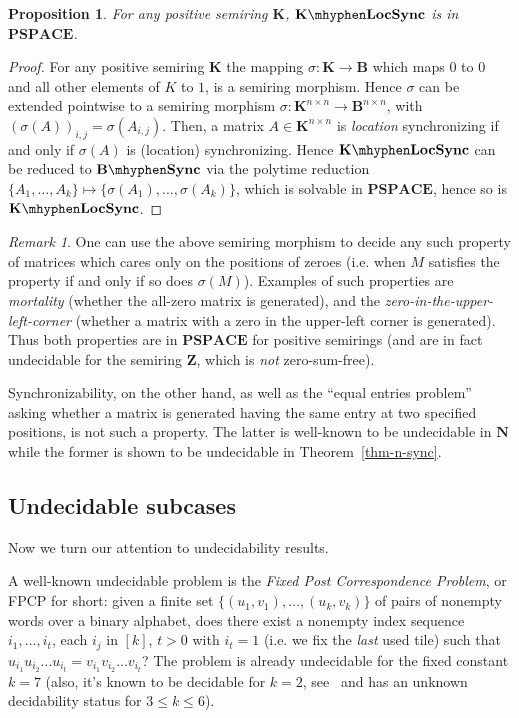 \documentclass[submission,copyright,creativecommons]{eptcs}
\def\bK{{\mathbf{K}}}
\def\bN{{\mathbf{N}}}
\def\bZ{{\mathbf{Z}}}
\def\bB{{\mathbf{B}}}
\theoremstyle{plain}
\newtheorem{proposition}{Proposition}
\theoremstyle{definition}
\theoremstyle{remark}
\newtheorem{remark}{Remark}
\begin{document}
\begin{proposition}
\label{prop-zsf-zdf}
For any positive semiring $\bK$, $\bK\mhyphen\mathbf{LocSync}$ is in $\mathbf{PSPACE}$.
\end{proposition}
\begin{proof}
For any positive semiring $\bK$ the mapping $\sigma:\bK\to\bB$ which maps $0$ to $0$ and all other elements of $K$ to $1$,
is a semiring morphism. Hence $\sigma$ can be extended pointwise to a semiring morphism $\sigma:\bK^{n\times n}\to\bB^{n\times n}$,
with $(\sigma(A))_{i,j}=\sigma(A_{i,j})$. Then, a matrix $A\in\bK^{n\times n}$ is \emph{location} synchronizing if and only if
$\sigma(A)$ is (location) synchronizing. Hence $\bK\mhyphen\mathbf{LocSync}$ can be reduced to $\bB\mhyphen\mathbf{Sync}$
via the polytime reduction $\{A_1,\ldots,A_k\}\mapsto\{\sigma(A_1),\ldots,\sigma(A_k)\}$, which is solvable in $\mathbf{PSPACE}$,
hence so is $\bK\mhyphen\mathbf{LocSync}$.
\end{proof}
\begin{remark}
One can use the above semiring morphism to decide any such property of matrices which cares only on the positions of zeroes
(i.e. when $M$ satisfies the property if and only if so does $\sigma(M)$).
Examples of such properties are \emph{mortality} (whether the all-zero matrix is generated),
and the \emph{zero-in-the-upper-left-corner} (whether a matrix with a zero in the upper-left corner is generated).
Thus both properties are in $\mathbf{PSPACE}$ for positive semirings
(and are in fact undecidable for the semiring $\bZ$, which is \emph{not} zero-sum-free).

Synchronizability, on the other hand, as well as the ``equal entries problem'' asking whether a matrix is generated having
the same entry at two specified positions, is not such a property. The latter is well-known to be undecidable in $\bN$
while the former is shown to be undecidable in Theorem~\ref{thm-n-sync}.
\end{remark}

\subsection{Undecidable subcases}
Now we turn our attention to undecidability results.

A well-known undecidable problem is the \emph{Fixed Post Correspondence Problem}, or FPCP for short: given a finite set
$\{(u_1,v_1),\ldots,(u_k,v_k)\}$ of pairs of nonempty words over a binary alphabet,
does there exist a nonempty index sequence $i_1,\ldots,i_t$, each $i_j$ in $[k]$, $t>0$ with $i_t=1$ (i.e. we fix the
\emph{last} used tile) such that
$u_{i_1}u_{i_2}\ldots u_{i_t}=v_{i_1}v_{i_2}\ldots v_{i_t}$? The problem is already undecidable for the fixed
constant $k=7$ (also, it's known to be decidable for $k=2$, see~\cite{halava} and has an unknown decidability status
for $3\leq k\leq 6$).
\end{document}
